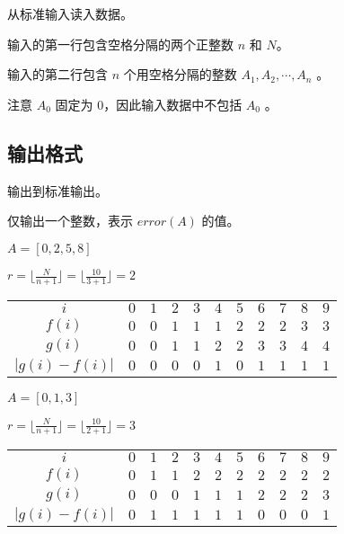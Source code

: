 从标准输入读入数据。

输入的第一行包含空格分隔的两个正整数 $n$ 和 $N$。

输入的第二行包含 $n$ 个用空格分隔的整数 $A_1,A_2,\cdots,A_n$
。

注意 $A_0$
 固定为 $0$，因此输入数据中不包括 $A_0$
。

\subsection*{输出格式}

输出到标准输出。

仅输出一个整数，表示 $error(A)$ 的值。

\examplebox*{}{}

$A=[0, 2, 5, 8]$

$r = \lfloor \frac{N}{n+1}\rfloor=\lfloor \frac{10}{3+1}\rfloor=2$

\begin{table}[H]
  \centering
  \begin{tabular}{ccccccccccc}
    \toprule
    $i$ & $0$ & $1$ & $2$ & $3$ & $4$ & $5$ & $6$ & $7$ & $8$ & $9$ \\
    $f(i)$ & $0$ & $0$ & $1$ & $1$ & $1$ & $2$ & $2$ & $2$ & $3$ & $3$ \\
    $g(i)$ & $0$ & $0$ & $1$ & $1$ & $2$ & $2$ & $3$ & $3$ & $4$ & $4$ \\
    $|g(i)-f(i)|$ & $0$ & $0$ & $0$ & $0$ & $1$ & $0$ & $1$ & $1$ & $1$ & $1$ \\
    \bottomrule
  \end{tabular}
\end{table}

\examplebox{}{}

\examplebox*{}{}

$A=[0, 1, 3]$

$r = \lfloor \frac{N}{n+1}\rfloor=\lfloor \frac{10}{2+1}\rfloor=3$

\begin{table}[H]
  \centering
  \begin{tabular}{ccccccccccc}
    \toprule
    $i$ & $0$ & $1$ & $2$ & $3$ & $4$ & $5$ & $6$ & $7$ & $8$ & $9$ \\
    $f(i)$ & $0$ & $1$ & $1$ & $2$ & $2$ & $2$ & $2$ & $2$ & $2$ & $2$ \\
    $g(i)$ & $0$ & $0$ & $0$ & $1$ & $1$ & $1$ & $2$ & $2$ & $2$ & $3$ \\
    $|g(i)-f(i)|$ & $0$ & $1$ & $1$ & $1$ & $1$ & $1$ & $0$ & $0$ & $0$ & $1$ \\
    \bottomrule
  \end{tabular}
\end{table}

